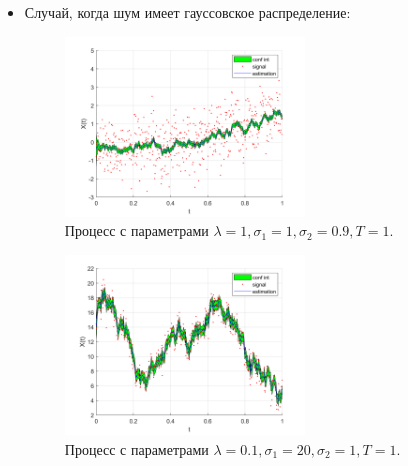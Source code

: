 \documentclass[oneside, final, 12pt]{article}
\begin{document}
	\begin{itemize}
		\item 	Случай, когда шум имеет гауссовское распределение:
					\begin{figure}[h!]
						\centering
						\includegraphics[width=0.6\textwidth]{../code/Task_10/pict/norm_1_1_90_ex.png}
						\caption{Процесс с параметрами $\lambda = 1,\sigma_1 = 1, \sigma_2 = 0.9, T = 1$.}
				    \end{figure}
				    \begin{figure}[h!]
						\centering
						\includegraphics[width=0.6\textwidth]{../code/Task_10/pict/norm_20_1_10_ex.png}
						\caption{Процесс с параметрами $\lambda = 0.1,\sigma_1 = 20, \sigma_2 = 1, T = 1$.}
				    \end{figure}
				    

\end{itemize}
\end{document}
